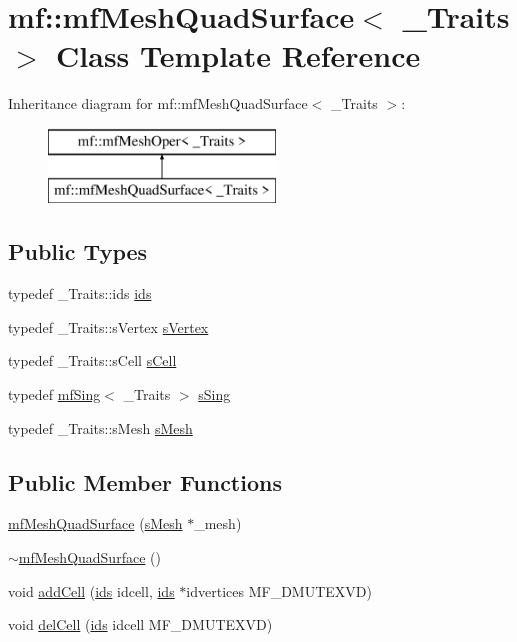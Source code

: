 \hypertarget{classmf_1_1mfMeshQuadSurface}{
\section{mf::mfMeshQuadSurface$<$ \_\-Traits $>$ Class Template Reference}
\label{classmf_1_1mfMeshQuadSurface}
}
Inheritance diagram for mf::mfMeshQuadSurface$<$ \_\-Traits $>$:\begin{figure}[H]
\begin{center}
\leavevmode
\includegraphics[height=2.000000cm]{classmf_1_1mfMeshQuadSurface}
\end{center}
\end{figure}
\subsection*{Public Types}
\begin{DoxyCompactItemize}
\item 
typedef \_\-Traits::ids \hyperlink{classmf_1_1mfMeshQuadSurface_a91f8c5a330192db329f7b2e116b9149d}{ids}
\item 
typedef \_\-Traits::sVertex \hyperlink{classmf_1_1mfMeshQuadSurface_a2a559debe3d66c95dddb91d4067573a1}{sVertex}
\item 
typedef \_\-Traits::sCell \hyperlink{classmf_1_1mfMeshQuadSurface_a1d1590394548b06c8c8ee3b6a9a7b242}{sCell}
\item 
typedef \hyperlink{classmf_1_1mfSing}{mfSing}$<$ \_\-Traits $>$ \hyperlink{classmf_1_1mfMeshQuadSurface_a416ad67b5e6186e038723e9098472631}{sSing}
\item 
typedef \_\-Traits::sMesh \hyperlink{classmf_1_1mfMeshQuadSurface_a5c71a1c02ec20c5c33393f8bd256168d}{sMesh}
\end{DoxyCompactItemize}
\subsection*{Public Member Functions}
\begin{DoxyCompactItemize}
\item 
\hyperlink{classmf_1_1mfMeshQuadSurface_ada24488577fc8be236ae3bc9c330c8d9}{mfMeshQuadSurface} (\hyperlink{classmf_1_1mfMeshOper_a96c05da9a054cf9ac58d15211922f936}{sMesh} $\ast$\_\-mesh)
\item 
\hyperlink{classmf_1_1mfMeshQuadSurface_ae15089bf425570d5de705ba132711d8b}{$\sim$mfMeshQuadSurface} ()
\item 
void \hyperlink{classmf_1_1mfMeshQuadSurface_af445edf48a12e761d93e91330bc7da99}{addCell} (\hyperlink{classmf_1_1mfMeshOper_a526d1466339244781fbdc0dbfe5ad210}{ids} idcell, \hyperlink{classmf_1_1mfMeshOper_a526d1466339244781fbdc0dbfe5ad210}{ids} $\ast$idvertices MF\_\-DMUTEXVD)
\item 
void \hyperlink{classmf_1_1mfMeshQuadSurface_add51cb72f83e0d0b7afed26e303bad02}{delCell} (\hyperlink{classmf_1_1mfMeshOper_a526d1466339244781fbdc0dbfe5ad210}{ids} idcell MF\_\-DMUTEXVD)
\end{DoxyCompactItemize}
